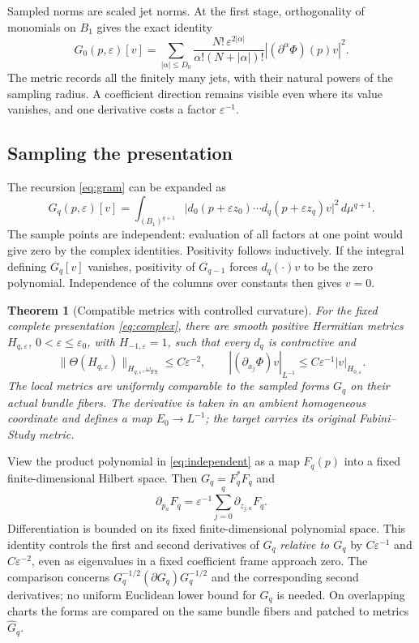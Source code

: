 \documentclass[11pt,reqno]{amsart}
\newtheorem{theorem}{Theorem}
\theoremstyle{remark}
\newcommand{\eps}{\varepsilon}
\newcommand{\FS}{\mathrm{FS}}
\providecommand{\DIFdelend}{} %
\begin{document}
Sampled norms are scaled jet norms. At the first stage, orthogonality of monomials on $B_1$ gives the
exact identity
\begin{equation}\label{eq:jets}
 G_0(p,\eps)[v]
=\sum_{|\alpha|\le D_0}
 \frac{N!\,\eps^{2|\alpha|}}{\alpha!(N+|\alpha|)!}
 |(\partial^\alpha\Phi)(p)v|^2.
\end{equation}
The metric records all the finitely many jets, with their natural
powers of the sampling radius. A coefficient direction remains
visible even where its value vanishes, and one derivative costs a
factor $\eps^{-1}$.

\subsection{Sampling the presentation}
\addtocounter{subsection}{-1}%
\DIFdelend The recursion \eqref{eq:gram} can be expanded as
\begin{equation}\label{eq:independent}
 G_q(p,\eps)[v]=\int_{(B_1)^{q+1}}
 \bigl|d_0(p+\eps z_0)\cdots d_q(p+\eps z_q)v\bigr|^2\,d\mu^{q+1}.
\end{equation}
The sample points are independent: evaluation of all factors at one
point would give zero by the complex identities. Positivity follows
inductively. If the integral defining $G_q[v]$ vanishes, positivity
of $G_{q-1}$ forces $d_q(\cdot)v$ to be the zero polynomial. Independence of the columns over constants then gives $v=0$.

\begin{theorem}[Compatible metrics with controlled curvature]
\label{thm:metrics}
For the fixed complete presentation \eqref{eq:complex}, there are smooth
positive Hermitian metrics $H_{q,\eps}$, $0<\eps\le\eps_0$, with
$H_{-1,\eps}=1$, such that every $d_q$ is contractive and
\begin{equation}\label{eq:metric-estimates}
 \|\Theta(H_{q,\eps})\|_{H_{q,\eps},\omega_{\FS}}
       \le C\eps^{-2},\qquad
 |(\partial_{x_j}\Phi)v|_{L^{-1}}
       \le C\eps^{-1}|v|_{H_{0,\eps}}.
\end{equation}
The local metrics are uniformly comparable to the sampled forms
$G_q$ on their actual bundle fibers. The derivative is taken in an
ambient homogeneous coordinate and defines a map $E_0\to L^{-1}$;
the target carries its original Fubini--Study metric.
\end{theorem}

View the product polynomial in \eqref{eq:independent} as a map
$F_q(p)$ into a fixed finite-dimensional Hilbert space. Then
$G_q=F_q^*F_q$ and
\[
 \partial_{p_a}F_q
 =\eps^{-1}\sum_{j=0}^q\partial_{z_{j,a}}F_q.
\]
Differentiation is bounded on its fixed finite-dimensional polynomial
space. This identity controls the first and second derivatives of
$G_q$ \emph{relative to $G_q$} by $C\eps^{-1}$ and $C\eps^{-2}$,
even as eigenvalues in a fixed coefficient frame approach zero.
The comparison concerns $G_q^{-1/2}(\partial G_q)G_q^{-1/2}$ and
the corresponding second derivatives; no uniform Euclidean lower
bound for $G_q$ is needed. On overlapping charts the forms are
compared on the same bundle  fibers and patched to metrics
$\widehat G_q$. 
\end{document}
